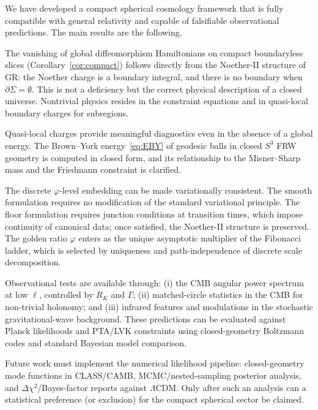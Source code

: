 \documentclass[12pt,a4paper]{article}
\newcommand{\Sig}{\Sigma}           %
\newcommand{\pa}{\partial}          %
\newcommand{\RK}{R_K}
\begin{document}
We have developed a compact spherical cosmology framework
that is fully compatible with general relativity and
capable of falsifiable observational predictions. The main
results are the following.

The vanishing of global diffeomorphism Hamiltonians on
compact boundaryless slices (Corollary~\ref{cor:compact})
follows directly from the Noether-II structure of GR: the
Noether charge is a boundary integral, and there is no
boundary when $\pa\Sig = \emptyset$. This is not a
deficiency but the correct physical description of a
closed universe. Nontrivial physics resides in the
constraint equations and in quasi-local boundary charges
for subregions.

Quasi-local charges provide meaningful diagnostics even
in the absence of a global energy. The Brown--York
energy~\eqref{eq:EBY} of geodesic balls in closed $S^3$
FRW geometry is computed in closed form, and its
relationship to the Misner--Sharp mass and the Friedmann
constraint is clarified.

The discrete $\varphi$-level embedding can be made
variationally consistent. The smooth formulation requires
no modification of the standard variational principle.
The floor formulation requires junction conditions at
transition times, which impose continuity of canonical
data; once satisfied, the Noether-II structure is preserved.
The golden ratio $\varphi$ enters as the unique asymptotic
multiplier of the Fibonacci ladder, which is selected by
uniqueness and path-independence of discrete scale
decomposition.

Observational tests are available through: (i) the CMB
angular power spectrum at low $\ell$, controlled by $\RK$
and $\Gamma$; (ii) matched-circle statistics in the CMB
for non-trivial holonomy; and (iii) infrared features and
modulations in the stochastic gravitational-wave background.
These predictions can be evaluated against Planck
likelihoods and PTA/LVK constraints using closed-geometry
Boltzmann codes and standard Bayesian model comparison.

Future work must implement the numerical likelihood
pipeline: closed-geometry mode functions in CLASS/CAMB,
MCMC/nested-sampling posterior analysis, and
$\Delta\chi^2$/Bayes-factor reports against $\Lambda$CDM.
Only after such an analysis can a statistical preference
(or exclusion) for the compact spherical sector be claimed.

\appendix
\end{document}
